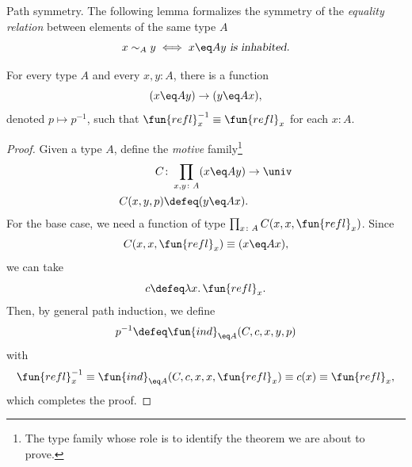 \begin{lpar}{Path symmetry.}
    The following lemma formalizes the symmetry of the \textsl{equality relation} between elements of the same type $A$
    \begin{equation}\label{eq:path-relation}
        x\sim_A y\iff x\eq Ay \textsl{ is inhabited.}
    \end{equation}
    
    \begin{lem}
        For every type\/ $A$ and every\/ $x,y\colon A$, there is a function
        \[
            (x\eq A y) \to (y\eq A x),
        \]
        denoted\/ $p\mapsto p^{-1}$, such that\/ $\fun{refl}_x^{-1}\equiv\fun{refl}_x$ for each\/ $x\colon A$.
    \end{lem}
    
    \begin{proof}
        Given a type $A$, define the \textsl{motive} family\footnote{The type family whose role is to identify the theorem we are about to prove.}
        \begin{align*}
            C&\colon\prod_{x,y\colon A}(x\eq Ay)\to\univ\\
            C(x,y,p)&\defeq(y\eq Ax).
        \end{align*}
        For the base case, we need a function of type $\prod_{x\colon A}C(x,x,\fun{refl}_x)$. Since
        \[
            C(x,x,\fun{refl}_x)\equiv(x\eq Ax),
        \]
        we can take
        \[
            c\defeq\lambda x.\,\fun{refl}_x.
        \]
        Then, by general path induction, we define
        \[
            p^{-1} \defeq \fun{ind}_{\eq A}(C,c,x,y,p)
        \]
        with
        \[
            \fun{refl}_x^{-1}
                \equiv\fun{ind}_{\eq A}(C,c,x,x,\fun{refl}_x)
                \equiv c(x)
                \equiv\fun{refl}_x,
        \]
        which completes the proof.
    \end{proof}
\end{lpar}

